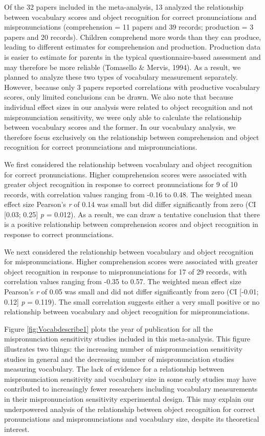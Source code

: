 \documentclass[man]{apa6}
\begin{document}
Of the 32 papers included in the meta-analysis, 13 analyzed the relationship between vocabulary scores and object recognition for correct pronunciations and mispronunciations (comprehension = 11 papers and 39 records; production = 3 papers and 20 records). Children comprehend more words than they can produce, leading to different estimates for comprehension and production. Production data is easier to estimate for parents in the typical questionnaire-based assessment and may therefore be more reliable (Tomasello \& Mervis, 1994). As a result, we planned to analyze these two types of vocabulary measurement separately. However, because only 3 papers reported correlations with productive vocabulary scores, only limited conclusions can be drawn. We also note that because individual effect sizes in our analysis were related to object recognition and not mispronunciation sensitivity, we were only able to calculate the relationship between vocabulary scores and the former. In our vocabulary analysis, we therefore focus exclusively on the relationship between comprehension and object recognition for correct pronunciations and mispronunciations.

We first considered the relationship between vocabulary and object recognition for correct pronunciations. Higher comprehension scores were associated with greater object recognition in response to correct pronunciations for 9 of 10 records, with correlation values ranging from -0.16 to 0.48. The weighted mean effect size Pearson's \emph{r} of 0.14 was small but did differ significantly from zero (CI {[}0.03; 0.25{]} \emph{p} = 0.012). As a result, we can draw a tentative conclusion that there is a positive relationship between comprehension scores and object recognition in response to correct pronunciations.

We next considered the relationship between vocabulary and object recognition for mispronunciations. Higher comprehension scores were associated with greater object recognition in response to mispronunciations for 17 of 29 records, with correlation values ranging from -0.35 to 0.57. The weighted mean effect size Pearson's \emph{r} of 0.05 was small and did not differ significantly from zero (CI {[}-0.01; 0.12{]} \emph{p} = 0.119). The small correlation suggests either a very small positive or no relationship between vocabulary and object recognition for mispronunciations.

Figure \ref{fig:Vocabdescribe1} plots the year of publication for all the mispronunciation sensitivity studies included in this meta-analysis. This figure illustrates two things: the increasing number of mispronunciation sensitivity studies in general and the decreasing number of mispronunciation studies measuring vocabulary. The lack of evidence for a relationship between mispronunciation sensitivity and vocabulary size in some early studies may have contributed to increasingly fewer researchers including vocabulary measurements in their mispronunciation sensitivity experimental design. This may explain our underpowered analysis of the relationship between object recognition for correct pronunciations and mispronunciations and vocabulary size, despite its theoretical interest.
\end{document}
